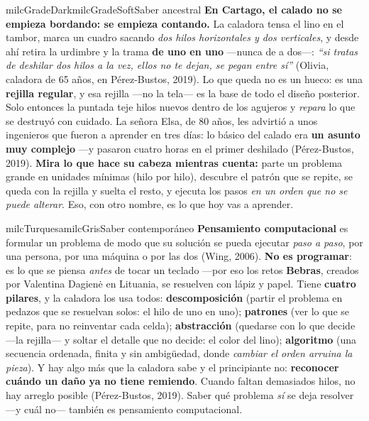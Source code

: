 \documentclass[11pt,letterpaper]{article}
\begin{document}
\begin{softbox}{milcGradeDark}{milcGradeSoft}{Saber ancestral}
\textbf{En Cartago, el calado no se empieza bordando: se empieza contando.} La caladora tensa el lino en el tambor, marca un cuadro sacando \emph{dos hilos horizontales y dos verticales}, y desde ahí retira la urdimbre y la trama \textbf{de uno en uno} ---nunca de a dos---: \emph{``si tratas de deshilar dos hilos a la vez, ellos no te dejan, se pegan entre sí''} (Olivia, caladora de 65 años, en Pérez-Bustos, 2019). Lo que queda no es un hueco: es una \textbf{rejilla regular}, y esa rejilla ---no la tela--- es la base de todo el diseño posterior. Solo entonces la puntada teje hilos nuevos dentro de los agujeros y \emph{repara} lo que se destruyó con cuidado. La señora Elsa, de 80 años, les advirtió a unos ingenieros que fueron a aprender en tres días: lo básico del calado era \textbf{un asunto muy complejo} ---y pasaron cuatro horas en el primer deshilado (Pérez-Bustos, 2019). \textbf{Mira lo que hace su cabeza mientras cuenta:} parte un problema grande en unidades mínimas (hilo por hilo), descubre el patrón que se repite, se queda con la rejilla y suelta el resto, y ejecuta los pasos \emph{en un orden que no se puede alterar}. Eso, con otro nombre, es lo que hoy vas a aprender.
\end{softbox}

\begin{softbox}{milcTurquesa}{milcGris}{Saber contemporáneo}
\textbf{Pensamiento computacional} es formular un problema de modo que su solución se pueda ejecutar \emph{paso a paso}, por una persona, por una máquina o por las dos (Wing, 2006). \textbf{No es programar}: es lo que se piensa \emph{antes} de tocar un teclado ---por eso los retos \textbf{Bebras}, creados por Valentina Dagienė en Lituania, se resuelven con lápiz y papel. Tiene \textbf{cuatro pilares}, y la caladora los usa todos: \textbf{descomposición} (partir el problema en pedazos que se resuelvan solos: el hilo de uno en uno); \textbf{patrones} (ver lo que se repite, para no reinventar cada celda); \textbf{abstracción} (quedarse con lo que decide ---la rejilla--- y soltar el detalle que no decide: el color del lino); \textbf{algoritmo} (una secuencia ordenada, finita y sin ambigüedad, donde \emph{cambiar el orden arruina la pieza}). Y hay algo más que la caladora sabe y el principiante no: \textbf{reconocer cuándo un daño ya no tiene remiendo}. Cuando faltan demasiados hilos, no hay arreglo posible (Pérez-Bustos, 2019). Saber qué problema \emph{sí} se deja resolver ---y cuál no--- también es pensamiento computacional.
\end{softbox}
\end{document}
